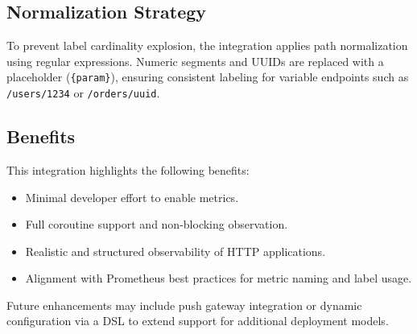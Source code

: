 \subsection*{Normalization Strategy}
To prevent label cardinality explosion, the integration applies path normalization using regular expressions. Numeric segments and UUIDs are replaced with a placeholder (\texttt{\{param\}}), ensuring consistent labeling for variable endpoints such as \texttt{/users/1234} or \texttt{/orders/uuid}.

\subsection*{Benefits}
This integration highlights the following benefits:
\begin{itemize}
  \item Minimal developer effort to enable metrics.
  \item Full coroutine support and non-blocking observation.
  \item Realistic and structured observability of HTTP applications.
  \item Alignment with Prometheus best practices for metric naming and label usage.
\end{itemize}

Future enhancements may include push gateway integration or dynamic configuration via a DSL to extend support for additional deployment models.
